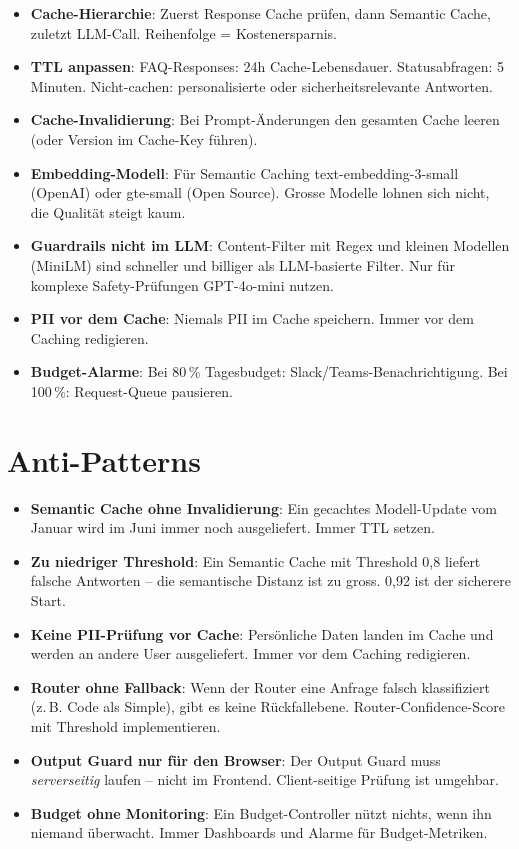 \begin{itemize}[leftmargin=*]
    \item \textbf{Cache-Hierarchie}: Zuerst Response Cache prüfen, dann Semantic Cache, zuletzt LLM-Call. Reihenfolge = Kostenersparnis.
    \item \textbf{TTL anpassen}: FAQ-Responses: 24h Cache-Lebensdauer. Statusabfragen: 5 Minuten. Nicht-cachen: personalisierte oder sicherheitsrelevante Antworten.
    \item \textbf{Cache-Invalidierung}: Bei Prompt-Änderungen den gesamten Cache leeren (oder Version im Cache-Key führen).
    \item \textbf{Embedding-Modell}: Für Semantic Caching text-embedding-3-small (OpenAI) oder gte-small (Open Source). Grosse Modelle lohnen sich nicht, die Qualität steigt kaum.
    \item \textbf{Guardrails nicht im LLM}: Content-Filter mit Regex und kleinen Modellen (MiniLM) sind schneller und billiger als LLM-basierte Filter. Nur für komplexe Safety-Prüfungen GPT-4o-mini nutzen.
    \item \textbf{PII vor dem Cache}: Niemals PII im Cache speichern. Immer vor dem Caching redigieren.
    \item \textbf{Budget-Alarme}: Bei 80\,\% Tagesbudget: Slack/Teams-Benachrichtigung. Bei 100\,\%: Request-Queue pausieren.
\end{itemize}

\section{Anti-Patterns}

\begin{itemize}[leftmargin=*]
    \item \textbf{Semantic Cache ohne Invalidierung}: Ein gecachtes Modell-Update vom Januar wird im Juni immer noch ausgeliefert. Immer TTL setzen.
    \item \textbf{Zu niedriger Threshold}: Ein Semantic Cache mit Threshold 0,8 liefert falsche Antworten -- die semantische Distanz ist zu gross. 0,92 ist der sicherere Start.
    \item \textbf{Keine PII-Prüfung vor Cache}: Persönliche Daten landen im Cache und werden an andere User ausgeliefert. Immer vor dem Caching redigieren.
    \item \textbf{Router ohne Fallback}: Wenn der Router eine Anfrage falsch klassifiziert (z.\,B. Code als Simple), gibt es keine Rückfallebene. Router-Confidence-Score mit Threshold implementieren.
    \item \textbf{Output Guard nur für den Browser}: Der Output Guard muss \textit{serverseitig} laufen -- nicht im Frontend. Client-seitige Prüfung ist umgehbar.
    \item \textbf{Budget ohne Monitoring}: Ein Budget-Controller nützt nichts, wenn ihn niemand überwacht. Immer Dashboards und Alarme für Budget-Metriken.
\end{itemize}

